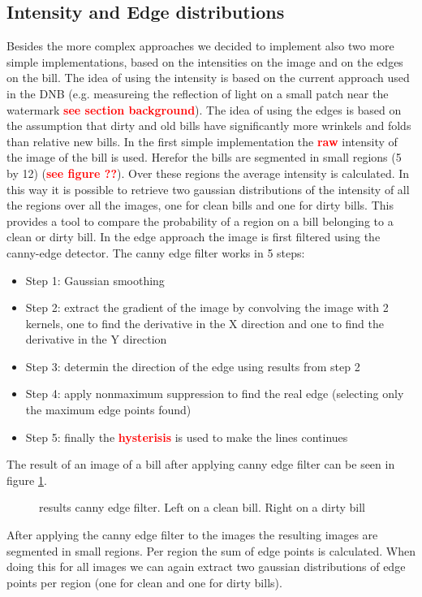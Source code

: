 \documentclass[11pt,twocolumn]{article}
\newcommand{\todo}[1]{\textcolor{red}{\textbf{#1}}}
\begin{document}
		\subsection{Intensity and Edge distributions}\label{sec:Intensity_Edge}
			Besides the more complex approaches we decided to implement	also two more simple implementations, based on the intensities on the image and on the edges on the bill. The idea of using the intensity is based on	the current approach used in the DNB (e.g. measureing the reflection of light on a small patch near the watermark \todo{see section background}). The idea of using the edges is based on the assumption that dirty and old	bills have significantly more wrinkels and folds than relative new bills. In
			the first simple implementation the \todo{raw} intensity of the image of the
			bill is used. Herefor the bills are segmented in small regions (5 by 12)
			(\todo{see figure ??}). Over these regions the average intensity is
			calculated. In this way it is possible to retrieve two gaussian distributions
			of the intensity of all the regions over all the images, one for clean bills
			and one for dirty bills. This provides a tool to compare the probability
			of a region on a bill belonging to a clean or dirty bill.
			In the edge approach the image is first filtered using the canny-edge
			detector. The canny edge filter works in 5 steps: 
			\begin{itemize} 
				\item Step 1: Gaussian smoothing 
				\item Step 2: extract the gradient of the image by convolving the image with 2 kernels, one to find the derivative in the X direction and one to find the derivative in the Y direction				
				\item Step 3: determin the direction of the edge using results from step 2  
				\item Step 4: apply nonmaximum suppression to find the real edge (selecting only the maximum edge points found)
				\item Step 5: finally the \todo{hysterisis} is used to make the lines continues
            \end{itemize} 
            The result of an image of a bill after applying canny edge filter
            can be seen in figure \ref{canny5Euro}.
            \begin{figure}[!hbtp]
				\centering 
				\caption{results canny edge filter. Left on a clean bill. Right on a dirty
				bill} 
				\label{canny5Euro} 
			\end{figure} 
			After applying the canny edge filter to the images the resulting images are
			segmented in small regions. Per region the sum of edge points is calculated.
			When doing this for all images we can again extract two gaussian
			distributions of edge points per region (one for clean and one for dirty
			bills).
			
\end{document}
